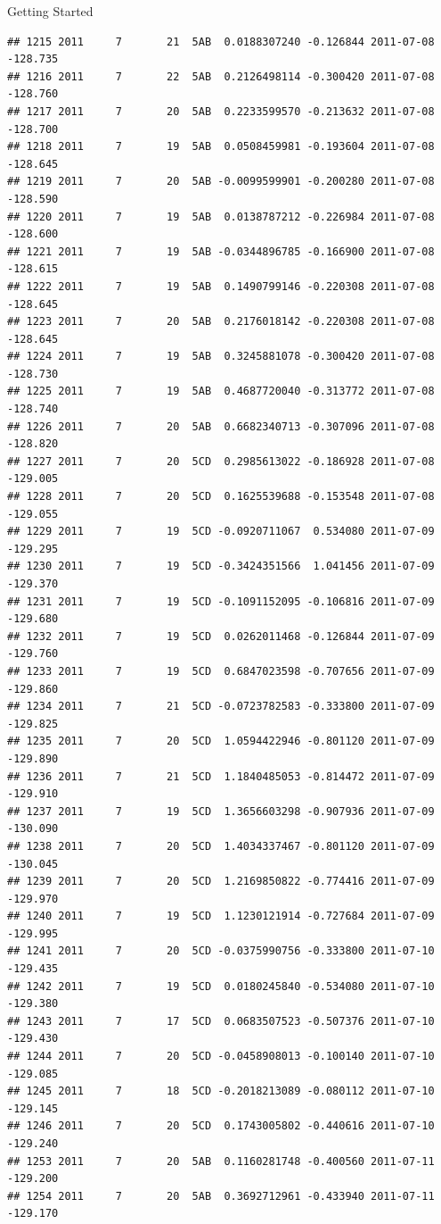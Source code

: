 \documentclass[
  ignorenonframetext,
]{beamer}
\begin{document}
\begin{frame}[fragile]{Getting Started}
\begin{verbatim}
## 1215 2011     7       21  5AB  0.0188307240 -0.126844 2011-07-08 -128.735
## 1216 2011     7       22  5AB  0.2126498114 -0.300420 2011-07-08 -128.760
## 1217 2011     7       20  5AB  0.2233599570 -0.213632 2011-07-08 -128.700
## 1218 2011     7       19  5AB  0.0508459981 -0.193604 2011-07-08 -128.645
## 1219 2011     7       20  5AB -0.0099599901 -0.200280 2011-07-08 -128.590
## 1220 2011     7       19  5AB  0.0138787212 -0.226984 2011-07-08 -128.600
## 1221 2011     7       19  5AB -0.0344896785 -0.166900 2011-07-08 -128.615
## 1222 2011     7       19  5AB  0.1490799146 -0.220308 2011-07-08 -128.645
## 1223 2011     7       20  5AB  0.2176018142 -0.220308 2011-07-08 -128.645
## 1224 2011     7       19  5AB  0.3245881078 -0.300420 2011-07-08 -128.730
## 1225 2011     7       19  5AB  0.4687720040 -0.313772 2011-07-08 -128.740
## 1226 2011     7       20  5AB  0.6682340713 -0.307096 2011-07-08 -128.820
## 1227 2011     7       20  5CD  0.2985613022 -0.186928 2011-07-08 -129.005
## 1228 2011     7       20  5CD  0.1625539688 -0.153548 2011-07-08 -129.055
## 1229 2011     7       19  5CD -0.0920711067  0.534080 2011-07-09 -129.295
## 1230 2011     7       19  5CD -0.3424351566  1.041456 2011-07-09 -129.370
## 1231 2011     7       19  5CD -0.1091152095 -0.106816 2011-07-09 -129.680
## 1232 2011     7       19  5CD  0.0262011468 -0.126844 2011-07-09 -129.760
## 1233 2011     7       19  5CD  0.6847023598 -0.707656 2011-07-09 -129.860
## 1234 2011     7       21  5CD -0.0723782583 -0.333800 2011-07-09 -129.825
## 1235 2011     7       20  5CD  1.0594422946 -0.801120 2011-07-09 -129.890
## 1236 2011     7       21  5CD  1.1840485053 -0.814472 2011-07-09 -129.910
## 1237 2011     7       19  5CD  1.3656603298 -0.907936 2011-07-09 -130.090
## 1238 2011     7       20  5CD  1.4034337467 -0.801120 2011-07-09 -130.045
## 1239 2011     7       20  5CD  1.2169850822 -0.774416 2011-07-09 -129.970
## 1240 2011     7       19  5CD  1.1230121914 -0.727684 2011-07-09 -129.995
## 1241 2011     7       20  5CD -0.0375990756 -0.333800 2011-07-10 -129.435
## 1242 2011     7       19  5CD  0.0180245840 -0.534080 2011-07-10 -129.380
## 1243 2011     7       17  5CD  0.0683507523 -0.507376 2011-07-10 -129.430
## 1244 2011     7       20  5CD -0.0458908013 -0.100140 2011-07-10 -129.085
## 1245 2011     7       18  5CD -0.2018213089 -0.080112 2011-07-10 -129.145
## 1246 2011     7       20  5CD  0.1743005802 -0.440616 2011-07-10 -129.240
## 1253 2011     7       20  5AB  0.1160281748 -0.400560 2011-07-11 -129.200
## 1254 2011     7       20  5AB  0.3692712961 -0.433940 2011-07-11 -129.170

\end{verbatim}
\end{frame}
\end{document}
